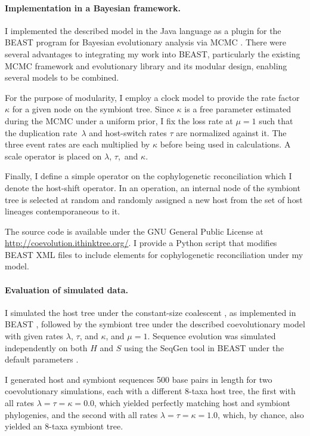 \documentclass[12pt,letterpaper]{article}
\begin{document}
\paragraph*{Implementation in a Bayesian framework.}

I implemented the described model in the Java language as a plugin for the BEAST program for Bayesian evolutionary analysis via \ac{MCMC} \parencite{Drummond:2012}. There were several advantages to integrating my work into BEAST, particularly the existing \ac{MCMC} framework and evolutionary library and its modular design, enabling several models to be combined.

For the purpose of modularity, I employ a clock model to provide the rate factor~$\kappa$ for a given node on the symbiont tree. Since $\kappa$ is a free parameter estimated during the \ac{MCMC} under a uniform prior, I fix the loss rate at $\mu = 1$ such that the duplication rate~$\lambda$ and host-switch rates $\tau$ are normalized against it. The three event rates are each multiplied by $\kappa$ before being used in calculations. A scale operator is placed on $\lambda$, $\tau$,~and $\kappa$.

Finally, I define a simple operator on the cophylogenetic reconciliation which I denote the host-shift operator. In an operation, an internal node of the symbiont tree is selected at random and randomly assigned a new host from the set of host lineages contemporaneous to it.

The source code is available under the GNU General Public License at \url{http://coevolution.ithinktree.org/}. I provide a Python script that modifies BEAST XML files to include elements for cophylogenetic reconciliation under my model.

\paragraph*{Evaluation of simulated data.}

I simulated the host tree under the constant-size coalescent \parencite{Kingman:1982}, as implemented in BEAST \parencite{Drummond:2012}, followed by the symbiont tree under the described coevolutionary model with given rates $\lambda$, $\tau$, and $\kappa$, and $\mu=1$. Sequence evolution was simulated independently on both $H$ and $S$ using the SeqGen tool in BEAST under the default parameters \parencite{Drummond:2012}.

I generated host and symbiont sequences 500 base pairs in length for two coevolutionary simulations, each with a different 8-taxa host tree, the first with all rates $\lambda = \tau = \kappa = 0.0$, which yielded perfectly matching host and symbiont phylogenies, and the second with all rates $\lambda = \tau = \kappa = 1.0$, which, by chance, also yielded an 8-taxa symbiont tree.
\end{document}
